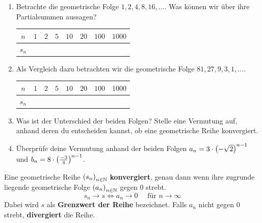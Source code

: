 \documentclass[11pt,oneside]{article}
\begin{document}
	\begin{aufgabe}
		\begin{enumerate}[label=\alph*)]
			\item Betrachte die geometrische Folge $1,2,4,8,16,\ldots$. Was können wir über ihre Partialsummen aussagen?
			\begingroup
			\renewcommand{\arraystretch}{1.5}
			\begin{table}[H]
				\centering
				\begin{tabular}{c|p{8mm}|p{8mm}|p{8mm}|p{8mm}|p{8mm}|p{12mm}|p{12mm}}
					$n$ & $1$ & $2$ & $5$ & $10$ & $20$ & $100$ & $1000$ \\\hline
					$s_n$ & & & & & & &
				\end{tabular}
			\end{table}
			\endgroup
			\item Als Vergleich dazu betrachten wir die geometrische Folge $81,27,9,3,1,\ldots$.
			\begingroup
			\renewcommand{\arraystretch}{1.5}
			\begin{table}[H]
				\centering
				\begin{tabular}{c|p{8mm}|p{8mm}|p{8mm}|p{8mm}|p{8mm}|p{12mm}|p{12mm}}
					$n$ & $1$ & $2$ & $5$ & $10$ & $20$ & $100$ & $1000$ \\\hline
					$s_n$ & & & & & & &
				\end{tabular}
			\end{table}
			\endgroup
			\item Was ist der Unterschied der beiden Folgen? Stelle eine Vermutung auf, anhand deren du entscheiden kannst, ob eine geometrische Reihe konvergiert.\vspace{5pt}\\
			\item Überprüfe deine Vermutung anhand der beiden Folgen $a_n=3\cdot\left(-\sqrt{2}\right)^{n-1}$ und $b_n=8\cdot\left(\frac{-3}{4}\right)^{n-1}$.\vspace{5pt}\\
		\end{enumerate}
	\end{aufgabe}
	\begin{definition}
		Eine geometrische Reihe $\left(s_n\right)_{n\in\mathbb{N}}$ \textbf{konvergiert}, genau dann wenn ihre zugrunde liegende geometrische Folge $\left(a_n\right)_{n\in\mathbb{N}}$ gegen $0$ strebt.
		\[s_n\to s \Leftrightarrow a_n\to0 \quad\text{ für } n\to\infty\]
		Dabei wird $s$ als \textbf{Grenzwert der Reihe} bezeichnet.\newline
		Falls $a_n$ nicht gegen $0$ strebt, \textbf{divergiert} die Reihe.
	\end{definition}
\end{document}
